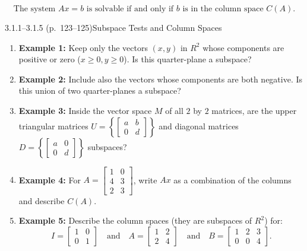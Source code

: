 \documentclass[11pt,a4paper,openany,oneside]{book}
\def\vect#1{#1}%
\def\mathbf#1{#1}%
\newcommand{\vect}[1]{\mathbf{#1}}
\numberwithin{equation}{chapter}
\begin{document}
\begin{result}[ (Solvability of $A\vect{x}=\vect{b}$)]
\begin{equation}
\text{The system } A\vect{x} = \vect{b} \text{ is solvable if and only if } \vect{b} \text{ is in the column space } C(A).
\end{equation}
\end{result}

\begin{example}{3.1.1--3.1.5 (p.\ 123--125)}{Subspace Tests and Column Spaces}
\begin{enumerate}
\item \textbf{Example 1:} Keep only the vectors $(x,y)$ in $\mathbf{R}^2$ whose components are positive or zero ($x\ge 0, y\ge 0$). Is this quarter-plane a subspace?
\item \textbf{Example 2:} Include also the vectors whose components are both negative. Is this union of two quarter-planes a subspace?
\item \textbf{Example 3:} Inside the vector space $\mathbf{M}$ of all $2$ by $2$ matrices, are the upper triangular matrices $\mathbf{U} = \left\{\begin{bmatrix}a & b\\0 & d\end{bmatrix}\right\}$ and diagonal matrices $\mathbf{D} = \left\{\begin{bmatrix}a & 0\\0 & d\end{bmatrix}\right\}$ subspaces?
\item \textbf{Example 4:} For $A = \begin{bmatrix}1 & 0\\4 & 3\\2 & 3\end{bmatrix}$, write $A\vect{x}$ as a combination of the columns and describe $C(A)$.
\item \textbf{Example 5:} Describe the column spaces (they are subspaces of $\mathbf{R}^2$) for:
\[
I = \begin{bmatrix} 1 & 0 \\ 0 & 1 \end{bmatrix} \quad \text{and} \quad A = \begin{bmatrix} 1 & 2 \\ 2 & 4 \end{bmatrix} \quad \text{and} \quad B = \begin{bmatrix} 1 & 2 & 3 \\ 0 & 0 & 4 \end{bmatrix}.
\]
\end{enumerate}
\end{example}
\end{document}
